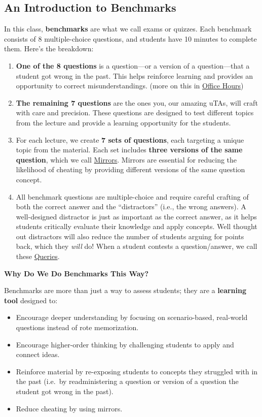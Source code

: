 \documentclass[
]{article}
\providecommand{\tightlist}{%
  \setlength{\itemsep}{0pt}\setlength{\parskip}{0pt}}
\begin{document}
\hypertarget{an-introduction-to-benchmarks}{%
\subsection{An Introduction to Benchmarks}\label{an-introduction-to-benchmarks}}

In this class, \textbf{benchmarks} are what we call exams or quizzes. Each benchmark consists of 8 multiple-choice questions, and students have 10 minutes to complete them. Here's the breakdown:

\begin{enumerate}
\def\labelenumi{\arabic{enumi}.}
\tightlist
\item
  \textbf{One of the 8 questions} is a question---or a version of a question---that a student got wrong in the past. This helps reinforce learning and provides an opportunity to correct misunderstandings. (more on this in \protect\hyperlink{office-hours}{Office Hours})
\item
  \textbf{The remaining 7 questions} are the ones you, our amazing uTAs, will craft with care and precision. These questions are designed to test different topics from the lecture and provide a learning opportunity for the students.
\item
  For each lecture, we create \textbf{7 sets of questions}, each targeting a unique topic from the material. Each set includes \textbf{three versions of the same question}, which we call \protect\hyperlink{mirrors-how-and-why}{Mirrors}. Mirrors are essential for reducing the likelihood of cheating by providing different versions of the same question concept.
\item
  All benchmark questions are multiple-choice and require careful crafting of both the correct answer and the ``distractors'' (i.e., the wrong answers). A well-designed distractor is just as important as the correct answer, as it helps students critically evaluate their knowledge and apply concepts. Well thought out distractors will also reduce the number of students arguing for points back, which they \emph{will} do! When a student contests a question/answer, we call these \protect\hyperlink{benchmark-queries}{Queries}.
\end{enumerate}

\textbf{Why Do We Do Benchmarks This Way?}

Benchmarks are more than just a way to assess students; they are a \textbf{learning tool} designed to:

\begin{itemize}
\tightlist
\item
  Encourage deeper understanding by focusing on scenario-based, real-world questions instead of rote memorization.
\item
  Encourage higher-order thinking by challenging students to apply and connect ideas.
\item
  Reinforce material by re-exposing students to concepts they struggled with in the past (i.e.~by readministering a question or version of a question the student got wrong in the past).
\item
  Reduce cheating by using mirrors.
\end{itemize}
\end{document}
